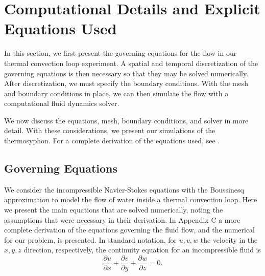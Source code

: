 \section{Computational Details and Explicit Equations Used}


In this section, we first present the governing equations for the flow in our thermal convection loop experiment.
A spatial and temporal discretization of the governing equations is then necessary so that they may be solved numerically.
After discretization, we must specify the boundary conditions.
With the mesh and boundary conditions in place, we can then simulate the flow with a computational fluid dynamics solver.

We now discuss the equations, mesh, boundary conditions, and solver in more detail.
With these considerations, we present our simulations of the thermosyphon.
For a complete derivation of the equations used, see \cite{reagan2013}.

\subsection{Governing Equations}
We consider the incompressible Navier-Stokes equations with the Boussinesq approximation to model the flow of water inside a thermal convection loop.
Here we present the main equations that are solved numerically, noting the assumptions that were necessary in their derivation.
In Appendix C a more complete derivation of the equations governing the fluid flow, and the numerical for our problem, is presented.
In standard notation, for $u,v,w$ the velocity in the $x,y,z$ direction, respectively, the continuity equation for an incompressible fluid is
\begin{equation} \frac{\partial u}{\partial x} + \frac{\partial v}{\partial y} + \frac{\partial w}{\partial z} = 0. \label{eq:NScontIco} \end{equation}

